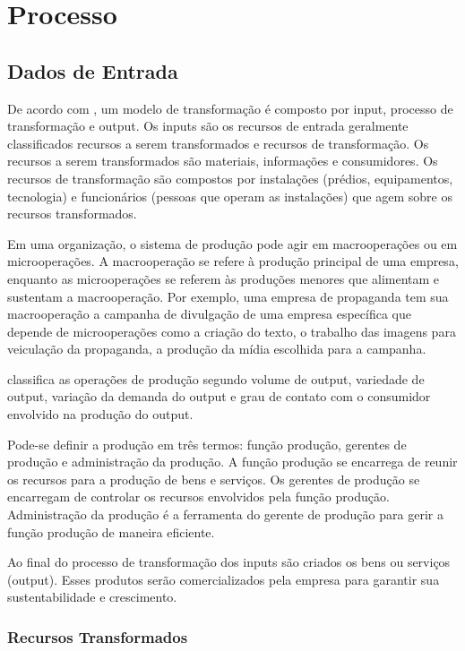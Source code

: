 \chapter[Processo]{Processo}

\section{Dados de Entrada}

De acordo com \cite{slack}, um modelo de transformação é composto por input, processo de transformação e output. Os inputs são os recursos de entrada geralmente classificados recursos a serem transformados e recursos de transformação. Os recursos a serem transformados são materiais, informações e consumidores. Os recursos de transformação são compostos por instalações (prédios, equipamentos, tecnologia) e funcionários (pessoas que operam as instalações) que agem sobre os recursos transformados.
 
Em uma organização, o sistema de produção pode agir em macrooperações ou em microoperações. A macrooperação se refere à produção principal de uma empresa, enquanto as microoperações se referem às produções menores que alimentam e sustentam a macrooperação. Por exemplo, uma empresa de propaganda tem sua macrooperação a campanha de divulgação de uma empresa específica que depende de microoperações como a criação do texto, o trabalho das imagens para veiculação da propaganda, a produção da mídia escolhida para a campanha.

\cite{slack} classifica as operações de produção segundo volume de output, variedade de output, variação da demanda do output e grau de contato com o consumidor envolvido na produção do output. 

Pode-se definir a produção em três termos: função produção, gerentes de produção e administração da produção. A função produção se encarrega de reunir os recursos para a produção de bens e serviços. Os gerentes de produção se encarregam de controlar os recursos envolvidos pela função produção. Administração da produção é a ferramenta do gerente de produção para gerir a função produção de maneira eficiente.

Ao final do processo de transformação dos inputs são criados os bens ou serviços (output). Esses produtos serão comercializados pela empresa para garantir sua sustentabilidade e crescimento.

\subsection{Recursos Transformados}

